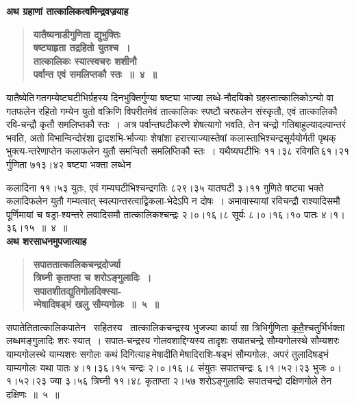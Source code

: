\documentclass[11pt, openany]{book}
\begin{document}
{\small \textbf{अथ ग्रहाणां तात्कालिकत्वमिन्द्रवज्रयाह\textendash }}

 \label{4.4}
\begin{quote}
{\large \textbf{{\color{purple}यातैष्यनाडीगुणिता द्युभुक्तिः \\
षष्ट्याहृता तद्रहितो युतश्च~। \\
तात्कालिकः स्यात्स्वचरः शशीनौ\\
पर्वान्त एवं समलिप्तकौ स्तः~॥~४~॥}}}
\end{quote}

यातैष्येति\textendash \,गतगम्येष्टघटीभिर्ग्रहस्य दिनभुक्तिर्गुण्या षष्ट्या भाज्या लब्धे-नौदयिको ग्रहस्तात्कालिकोऽन्यो वा गतफलेन रहितो गम्येन युतो वक्रिणि विपरीतमेवं तात्कालिकः स्पष्टौ चरफलेन संस्कृतौ, एवं तात्कालिकौ रवि-चन्द्रौ कृतौ समलिप्तकौ स्तः~। अत्र पर्वान्तघटीकरणे शेषत्यागो भवति, तेन चन्द्रो \;गतिबाहुल्यादल्पान्तरं \;भवति, \;अतो \;विभान्विन्दोरंशा \;द्वादशभि-र्भाज्याः शेषांशा हरात्त्याज्यास्तेषां कलास्ताभिश्चन्द्रसूर्ययोर्गती पृथक् भुक्त्य-न्तरेणाप्तेन कलाफलेन युतौ समन्वितौ समलिप्तिकौ स्तः~। यथैष्यघटीभिः ११।३८ रविगति\textendash \,६१।२१\textendash \,र्गुणिता ७१३।४२ षष्ट्या भक्ता लब्धेन

\newpage

\noindent कलादिना ११।५३ युतः, एवं गम्यघटीभिश्चन्द्रगतिः ८२९।३५ यातघटी ३।११ गुणिते षष्ट्या \;भक्ते \;कलादिफलेन \;युतौ \;गम्यत्वात् \;स्वल्पान्तरत्वाद्विकला-भेदेऽपि न दोषः~। अमावास्यायां रविचन्द्रौ राश्यादिसमौ पूर्णिमायां च षड्रा-श्यन्तरे लवादिसमौ तात्कालिकश्चन्द्रः २।०।१६।८ सूर्यः ८।०।१६।१० पातः ४।१।३६।१५~॥~४~॥\\

{\small \textbf{अथ शरसाधनमुपजात्याह\textendash }}

 \label{4.5}
\begin{quote}
{\large \textbf{{\color{purple}सपाततात्कालिकचन्द्रदोर्ज्या \\
त्रिघ्नी कृताप्ता च शरोऽङ्गुलादिः~। \\
सपातशीतद्युतिगोलदिक्स्या-\\
न्मेषादिषड्भं खलु सौम्यगोलः~॥~५~॥}}}
\end{quote}

सपातेति\textendash \;तात्कालिकपातेन ~सहितस्य ~तात्कालिकचन्द्रस्य \;भुजज्या कार्या सा त्रिभिर्गुणिता \hyperref[4.5]{कृतै}श्चतुर्भिर्भक्ता लब्धमङ्गुलादिः शरः स्यात्~। सपात-चन्द्रस्य \;गोलवशाद्दिग्यस्य \;तादृशः \;सपातचन्द्रे \;सौम्यगोलस्थे \;सौम्यशरः याम्यगोलस्थे याम्यशरः सगोलः कथं दिगित्याह\textendash \,मेषादीति\textendash \,मेषादिराशि-षड्भं सौम्यगोलः, अपरं तुलादिषड्भं याम्यगोलः यथा पातः ४।१।३६।१५ चन्द्रः २।०।१६।८ संयुतः सपातचन्द्रः ६।१।५२।२३ भुजः ०।१।५२।२३ ज्या ३।५६ त्रिघ्नी \;११।४८ \;कृताप्ता \;२।५७ \;शरोऽङ्गुलादिः \;सपातचन्द्रो \;दक्षिणगोले \;तेन दक्षिणः~॥~५~॥\\
\end{document}
